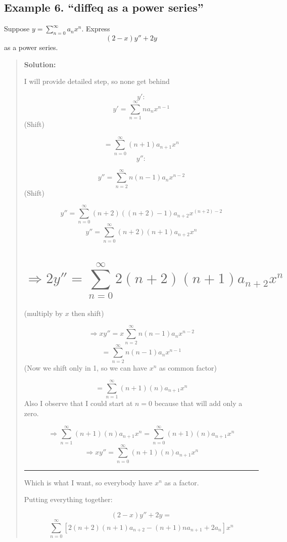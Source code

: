 \documentclass[
  letterpaper,
  DIV=11,
  numbers=noendperiod]{scrreprt}
\theoremstyle{plain}
\theoremstyle{remark}
\begin{document}
\subsection{Example 6. ``diffeq as a power
series''}\label{example-6.-diffeq-as-a-power-series}

\begin{tcolorbox}[enhanced jigsaw, title=\textcolor{quarto-callout-tip-color}{\faLightbulb}\hspace{0.5em}{Example}, colbacktitle=quarto-callout-tip-color!10!white, opacitybacktitle=0.6, opacityback=0, rightrule=.15mm, breakable, titlerule=0mm, colback=white, bottomtitle=1mm, colframe=quarto-callout-tip-color-frame, toprule=.15mm, leftrule=.75mm, toptitle=1mm, arc=.35mm, bottomrule=.15mm, left=2mm, coltitle=black]

Suppose \(y=\sum_{n=0}^\infty a_nx^n\). Express \[(2-x)y''+2y\] as a
power series.

\begin{quote}
\textbf{Solution:}

I will provide detailed step, so none get behind

\[y':\] \[y'=\sum_{n=1}^\infty na_nx^{n-1}\] (Shift)

\[=\sum_{n=0}^\infty (n+1)a_{n+1}x^{n}\] \[y'':\]

\[y''=\sum_{n=2}^\infty n(n-1)a_nx^{n-2}\] (Shift)

\[y''=\sum_{n=0}^\infty (n+2)((n+2)-1)a_{n+2}x^{(n+2)-2}\]
\[y''=\sum_{n=0}^\infty (n+2)(n+1)a_{n+2}x^{n}\]

\section{\texorpdfstring{\[\Rightarrow \boxed{2y''=\sum_{n=0}^\infty 2(n+2)(n+1)a_{n+2}x^{n}}\]}{\textbackslash Rightarrow \textbackslash boxed\{2y\textquotesingle\textquotesingle=\textbackslash sum\_\{n=0\}\^{}\textbackslash infty 2(n+2)(n+1)a\_\{n+2\}x\^{}\{n\}\}}}\label{rightarrow-boxed2ysum_n0infty-2n2n1a_n2xn}

(multiply by \(x\) then shift)

\[\Rightarrow xy''=x\sum_{n=2}^\infty n(n-1)a_nx^{n-2}\]
\[=\sum_{n=2}^\infty n(n-1)a_nx^{n-1}\] (Now we shift only in 1, so we
can have \(x^n\) as common factor)

\[=\sum_{n=1}^\infty (n+1)(n)a_{n+1}x^{n}\] Also I observe that I could
start at \(n=0\) because that will add only a zero.

\[\Rightarrow \sum_{n=1}^\infty (n+1)(n)a_{n+1}x^{n}=\sum_{n=0}^\infty (n+1)(n)a_{n+1}x^{n}\]
\[\Rightarrow \boxed{xy''=\sum_{n=0}^\infty (n+1)(n)a_{n+1}x^{n}}\]

\begin{center}\rule{0.5\linewidth}{0.5pt}\end{center}

Which is what I want, so everybody have \(x^n\) as a factor.

Putting everything together:

\[(2-x)y''+2y=\]
\[\sum_{n=0}^\infty\left[ 2(n+2)(n+1)a_{n+2}-(n+1)na_{n+1}+2a_n\right]x^n\]
\end{quote}

\end{tcolorbox}
\end{document}
